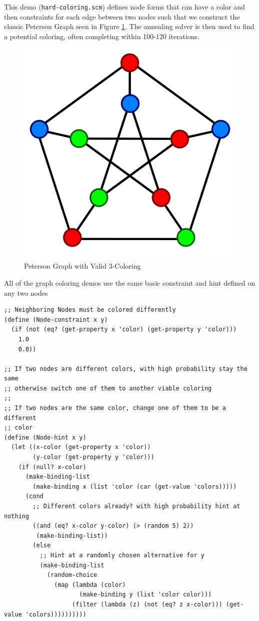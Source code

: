 \documentclass[12pt,a4paper]{article}
\begin{document}
This demo (\texttt{hard-coloring.scm}) defines node forms that can have a color and then constraints for each edge between two nodes such that we construct the classic Peterson Graph seen in Figure \ref{fig:Peterson}.  The annealing solver is then used to find a potential coloring, often completing within 100-120 iterations.
\begin{figure}[H]
\caption{Peterson Graph with Valid 3-Coloring}
\centering
\includegraphics[scale=.5]{peterson.png}
\label{fig:Peterson}
\end{figure}

All of the graph coloring demos use the same basic constraint and hint defined on any two nodes
\begin{lstlisting}
;; Neighboring Nodes must be colored differently
(define (Node-constraint x y)
  (if (not (eq? (get-property x 'color) (get-property y 'color)))
    1.0
    0.0))

;; If two nodes are different colors, with high probability stay the same
;; otherwise switch one of them to another viable coloring
;;
;; If two nodes are the same color, change one of them to be a different
;; color
(define (Node-hint x y)
  (let ((x-color (get-property x 'color))
        (y-color (get-property y 'color)))
    (if (null? x-color)
      (make-binding-list
        (make-binding x (list 'color (car (get-value 'colors)))))
      (cond
        ;; Different colors already? with high probability hint at nothing
        ((and (eq? x-color y-color) (> (random 5) 2))
         (make-binding-list))
        (else
          ;; Hint at a randomly chosen alternative for y
          (make-binding-list
            (random-choice
              (map (lambda (color)
                     (make-binding y (list 'color color)))
                   (filter (lambda (z) (not (eq? z x-color))) (get-value 'colors))))))))))
\end{lstlisting}
\end{document}
